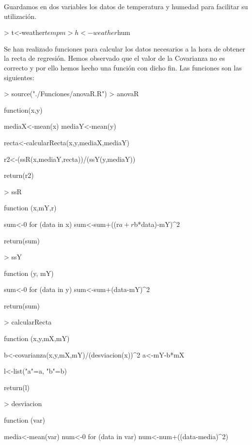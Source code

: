\documentclass [a4paper] {article}
\begin{document}
\bigskip
Guardamos en dos variables los datos de temperatura y humedad para facilitar su utilización.
\begin{Schunk}
\begin{Sinput}
> t<-weather$tempm
> h<-weather$hum
\end{Sinput}
\end{Schunk}

\bigskip
Se han realizado funciones para calcular los datos necesarios a la hora de obtener la recta de regresión. Hemos observado que
el valor de la Covarianza no es correcto y por ello hemos hecho una función con dicho fin. Las funciones son las siguientes:
\begin{Schunk}
\begin{Sinput}
> source("./Funciones/anovaR.R")
> anovaR
\end{Sinput}
\begin{Soutput}
function(x,y) {
    mediaX<-mean(x)
    mediaY<-mean(y)

    recta<-calcularRecta(x,y,mediaX,mediaY)

    r2<-(ssR(x,mediaY,recta))/(ssY(y,mediaY))

    return(r2)
}
\end{Soutput}
\begin{Sinput}
> ssR
\end{Sinput}
\begin{Soutput}
function (x,mY,r) {
    sum<-0
    for (data in x){
        sum<-sum+((r$a+r$b*data)-mY)^2
    }

    return(sum)
}
\end{Soutput}
\begin{Sinput}
> ssY
\end{Sinput}
\begin{Soutput}
function (y, mY) {
    sum<-0
    for (data in y){
        sum<-sum+(data-mY)^2
    }
    
    return(sum)
}
\end{Soutput}
\begin{Sinput}
> calcularRecta
\end{Sinput}
\begin{Soutput}
function (x,y,mX,mY) {
    b<-covarianza(x,y,mX,mY)/(desviacion(x))^2
    a<-mY-b*mX

    l<-list("a"=a, "b"=b)

    return(l)
}
\end{Soutput}
\begin{Sinput}
> desviacion
\end{Sinput}
\begin{Soutput}
function (var) {
    media<-mean(var)
    num<-0
    for (data in var){
        num<-num+((data-media)^2)
    }

}
\end{Soutput}
\end{Schunk}
\end{document}
